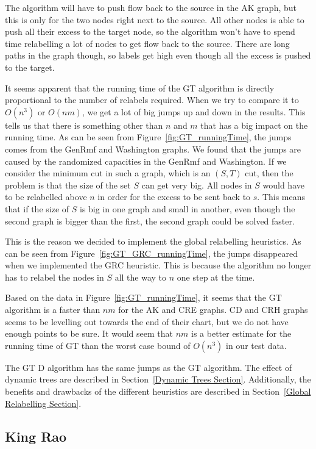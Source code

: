 The algorithm will have to push flow back to the source in the AK graph, but this is only for the two nodes right next to the source.
All other nodes is able to push all their excess to the target node, so the algorithm won't have to spend time relabelling a lot of nodes to get flow back to the source.
There are long paths in the graph though, so labels get high even though all the excess is pushed to the target.


It seems apparent that the running time of the GT algorithm is directly proportional to the number of relabels required.
When we try to compare it to $O(n^3)$ or $O(nm)$, we get a lot of big jumps up and down in the results.
This tells us that there is something other than $n$ and $m$ that has a big impact on the running time.
As can be seen from Figure~\ref{fig:GT_runningTime}, the jumps comes from the GenRmf and Washington graphs. 
We found that the jumps are caused by the randomized capacities in the GenRmf and Washington.
If we consider the minimum cut in such a graph, which is an $(S, T)$ cut, then the problem is that the size of the set $S$ can get very big.
All nodes in $S$ would have to be relabelled above $n$ in order for the excess to be sent back to $s$.
This means that if the size of $S$ is big in one graph and small in another, even though the second graph is bigger than the first, 
the second graph could be solved faster.


This is the reason we decided to implement the global relabelling heuristics. 
As can be seen from Figure~\ref{fig:GT_GRC_runningTime}, the jumps disappeared when we implemented the GRC heuristic.
This is because the algorithm no longer has to relabel the nodes in $S$ all the way to $n$ one step at the time.

Based on the data in Figure~\ref{fig:GT_runningTime}, it seems that the GT algorithm is a faster than $nm$ for the AK and CRE graphs.
CD and CRH graphs seems to be levelling out towards the end of their chart, but we do not have enough points to be sure. 
It would seem that $nm$ is a better estimate for the running time of GT than the worst case bound of $O(n^3)$ in our test data.

The GT D algorithm has the same jumps as the GT algorithm. 
The effect of dynamic trees are described in Section~\ref{Dynamic Trees Section}.
Additionally, the benefits and drawbacks of the different heuristics are described in Section~\ref{Global Relabelling Section}.

\subsection{King Rao}
\label{KingRaoResults}

